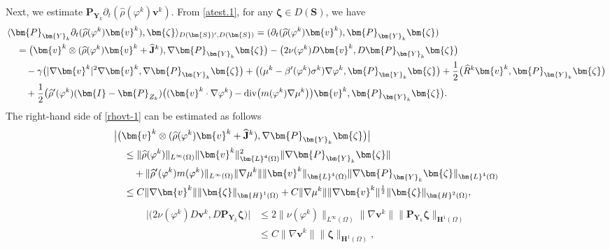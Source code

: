 \documentclass[11pt,reqno]{amsart}
\def\l{\langle}
\def\r{\rangle}
\def\div{\mathrm{div}}
\def\J{\mathbf{J}}
\def\vv{\bm{v}}
\begin{document}
Next, we estimate $\bm{P}_{\bm{Y}_{k}} \partial_t(\widehat{\rho}(\varphi^k)\vv^k)$.
From \eqref{atest.1}, for any $\bm{\zeta}\in D(\bm{S})$, we have
%
\begin{align}
&\l\bm{P}_{\bm{Y}_{k}} \partial_t(\widehat{\rho}(\varphi^k)\vv^k),\bm{\zeta} \r_{D(\bm{S})',D(\bm{S})}
= (\partial_t(\widehat{\rho}(\varphi^k)\vv^k),\bm{P}_{\bm{Y}_{k}} \bm{\zeta} )\notag\\
&\quad = \big(\vv^k \otimes ( \widehat{\rho}(\varphi^k) \vv^k
+ \widehat{\J}^k), \nabla \bm{P}_{\bm{Y}_{k}}\bm{ \zeta}\big)
-\big( 2\nu(\varphi^{k}) D\bm{v}^{k},D\bm{P}_{\bm{Y}_{k}}\bm{\zeta}\big)
\notag\\
&\qquad -\gamma \big(|\nabla\vv^k|^2\nabla\vv^k,\nabla \bm{P}_{\bm{Y}_{k}}\bm{\zeta}\big)
+ \big((\mu^{k} -\beta'(\varphi^k) \sigma^{k})\nabla \varphi^{k},\bm{P}_{\bm{Y}_{k}}\bm {\zeta}\big)
+ \frac12 \big(\widehat{R}^k\vv^k,\bm{P}_{\bm{Y}_{k}}\bm{\zeta}\big)
\notag\\
&\qquad + \frac12\big(\widehat{\rho}'(\varphi^k)(\bm{I}-\bm{P}_{Z_{k}}) \big((\bm{v}^k\cdot\nabla\varphi^k)-\div \big(m(\varphi^k)\nabla \mu^k\big)\big)\vv^k,\bm{P}_{\bm{Y}_{k}}\bm{\zeta}\big).
\label{rhovt-1}
\end{align}
%
The right-hand side of \eqref{rhovt-1} can be estimated as follows
\begin{align*}
&\big|\big(\vv^k \otimes ( \widehat{\rho}(\varphi^k) \vv^k + \widehat{\J}^k), \nabla \bm{P}_{\bm{Y}_{k}}\bm{ \zeta}\big)\big|
\\
&\quad \leq \|\widehat{\rho}(\varphi^k)\|_{L^\infty(\Omega)} \|\vv^k\|_{\bm{L}^4(\Omega)}^2\|\nabla \bm{P}_{\bm{Y}_{k}}\bm{ \zeta}\|
\notag\\
&\qquad + \|\widehat{\rho}'(\varphi^k) m(\varphi^k)\|_{L^\infty(\Omega)} \| \nabla \mu^k\|\|\vv^k\|_{\bm{L}^4(\Omega)} \|\nabla \bm{P}_{\bm{Y}_{k}}\bm{ \zeta}\|_{\bm{L}^4(\Omega)}
\\
&\quad \leq C\|\nabla \vv^k\| \|\bm{\zeta}\|_{\bm{H}^1(\Omega)}
+ C  \| \nabla \mu^k\|\|\nabla \vv^k\|^\frac{1}{2} \|\bm{\zeta}\|_{\bm{H}^2(\Omega)},
\end{align*}
%
\begin{align*}
\big|\big( 2\nu(\varphi^{k}) D\bm{v}^{k}, D\bm{P}_{\bm{Y}_{k}}\bm{\zeta}\big)\big|
&\leq 2\|\nu(\varphi^{k})\|_{L^\infty(\Omega)}\|\nabla \bm{v}^{k}\|\|\bm{P}_{\bm{Y}_{k}}\bm{\zeta}\|_{\bm{H}^1(\Omega)}
\\
&\leq C\|\nabla \bm{v}^{k}\|\|\bm{\zeta}\|_{\bm{H}^1(\Omega)},
\end{align*}
\end{document}
